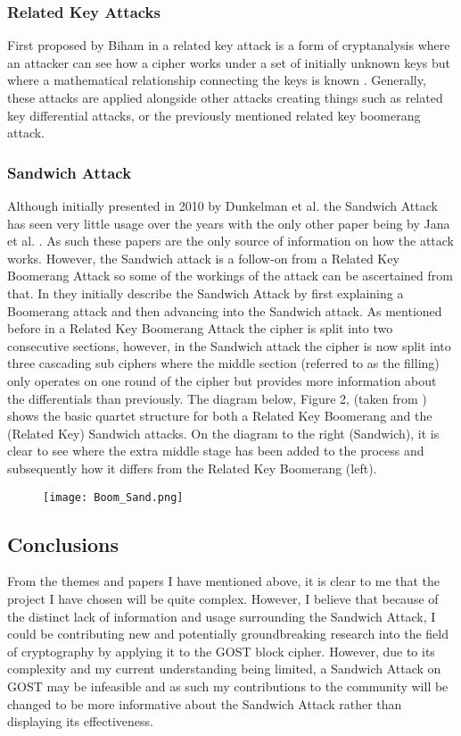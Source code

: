 \documentclass{article}
\begin{document}
\subsubsection{Related Key Attacks}
First proposed by Biham in \cite{jofc-1994-14102} a related key attack is a form of cryptanalysis where an attacker can see how a cipher works under a set of initially unknown keys but where a mathematical relationship connecting the keys is known \cite{wiki:Related-key_attack}. Generally, these attacks are applied alongside other attacks creating things such as related key differential attacks, or the previously mentioned related key boomerang attack. 
\subsubsection{Sandwich Attack}
Although initially presented in 2010 by Dunkelman et al. \cite{C:DunKelSha10} the Sandwich Attack has seen very little usage over the years with the only other paper being by Jana et al. \cite{DBLP:journals/iacr/JanaRSP23}. As such these papers are the only source of information on how the attack works. However, the Sandwich attack is a follow-on from a Related Key Boomerang Attack so some of the workings of the attack can be ascertained from that. In \cite{C:DunKelSha10} they initially describe the Sandwich Attack by first explaining a Boomerang attack and then advancing into the Sandwich attack. 
As mentioned before in a Related Key Boomerang Attack the cipher is split into two consecutive sections, however, in the Sandwich attack the cipher is now split into three cascading sub ciphers where the middle section (referred to as the filling) only operates on one round of the cipher but provides more information about the differentials than previously. 
The diagram below, Figure 2, (taken from \cite{C:DunKelSha10}) shows the basic quartet structure for both a Related Key Boomerang and the (Related Key) Sandwich attacks. On the diagram to the right (Sandwich), it is clear to see where the extra middle stage has been added to the process and subsequently how it differs from the Related Key Boomerang (left). 

\begin{figure}[hbt!]
    \centering
    \texttt{[image: Boom\_Sand.png]}
    \caption{}
    \label{fig:enter-label}
\end{figure}
 
\subsection{Conclusions}
From the themes and papers I have mentioned above, it is clear to me that the project I have chosen will be quite complex. However, I believe that because of the distinct lack of information and usage surrounding the Sandwich Attack, I could be contributing new and potentially groundbreaking research into the field of cryptography by applying it to the GOST block cipher. However, due to its complexity and my current understanding being limited, a Sandwich Attack on GOST may be infeasible and as such my contributions to the community will be changed to be more informative about the Sandwich Attack rather than displaying its effectiveness. 




\end{document}
